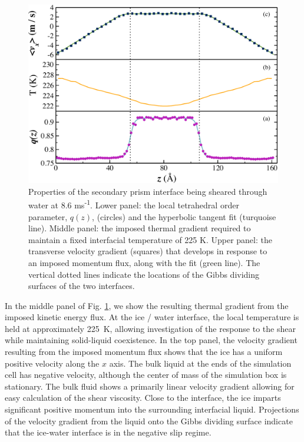 \begin{figure}
\includegraphics[width=\linewidth]{Figures/Sec_comic_strip}
\caption{\label{fig:spComic} Properties of the secondary prism
  interface being sheared through water at 8.6
  ms\textsuperscript{-1}. Lower panel: the local tetrahedral order
  parameter, $q(z)$, (circles) and the hyperbolic tangent fit
  (turquoise line).  Middle panel: the imposed thermal gradient
  required to maintain a fixed interfacial temperature of 225 K. Upper
  panel: the transverse velocity gradient (squares) that develops in
  response to an imposed momentum flux, along with the fit (green
  line). The vertical dotted lines indicate the locations of the Gibbs
  dividing surfaces of the two interfaces.}
\end{figure}

In the middle panel of Fig. \ref{fig:spComic}, we show the resulting
thermal gradient from the imposed kinetic energy flux. At the ice /
water interface, the local temperature is held at approximately 225~K, allowing
investigation of the response to the shear while maintaining
solid-liquid coexistence. In the top panel, the velocity gradient
resulting from the imposed momentum flux shows that the ice has a
uniform positive velocity along the $x$ axis. The bulk liquid at the
ends of the simulation cell has negative velocity, although the center
of mass of the simulation box is stationary.  The bulk fluid shows a
primarily linear velocity gradient allowing for easy calculation of
the shear viscosity. Close to the interface, the ice imparts
significant positive momentum into the surrounding interfacial liquid.
Projections of the velocity gradient from the liquid onto the Gibbs
dividing surface indicate that the ice-water interface is in the
negative slip regime.

